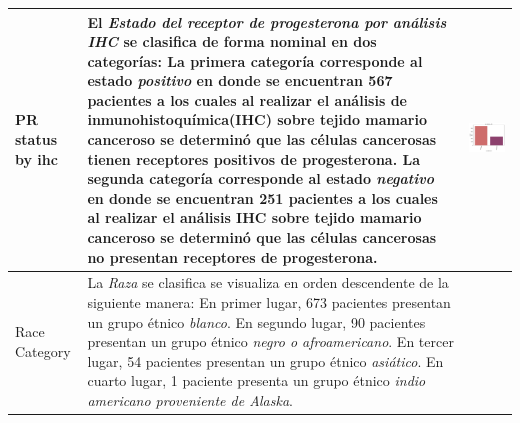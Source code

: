 \begin{table}[!htb]
\begin{threeparttable}
\begin{tabular}{p{2.5cm} p{7cm} p{6.5cm}}
			PR status by ihc
			&El \textit{Estado del receptor de progesterona por análisis IHC} se clasifica de forma nominal en dos categorías: La primera categoría corresponde al estado \textit{positivo} en donde se encuentran 567 pacientes a los cuales al realizar el análisis de inmunohistoquímica(IHC) sobre tejido mamario canceroso se determinó que las células cancerosas tienen receptores positivos de progesterona. La segunda categoría corresponde al estado \textit{negativo} en donde se encuentran 251 pacientes a los cuales al realizar el análisis IHC sobre tejido mamario canceroso se determinó que las células cancerosas no presentan receptores de progesterona.
			& \begin{center}\includegraphics[width=1\linewidth]{NOTEBOOK/IMAGENES_DESCRIPTIVAS/37_pr_status_ihc}\end{center}
			\\ \hline
			
			Race Category
			& La \textit{Raza} se clasifica se visualiza en orden descendente de la siguiente manera: En primer lugar, 673 pacientes presentan un grupo étnico \textit{blanco}. En segundo lugar, 90 pacientes presentan un grupo étnico \textit{negro o afroamericano}. En tercer lugar, 54 pacientes presentan un grupo étnico \textit{asiático}. En cuarto lugar, 1 paciente presenta un grupo étnico \textit{indio americano proveniente de Alaska}.
			

\end{tabular}
\end{threeparttable}
\end{table}
